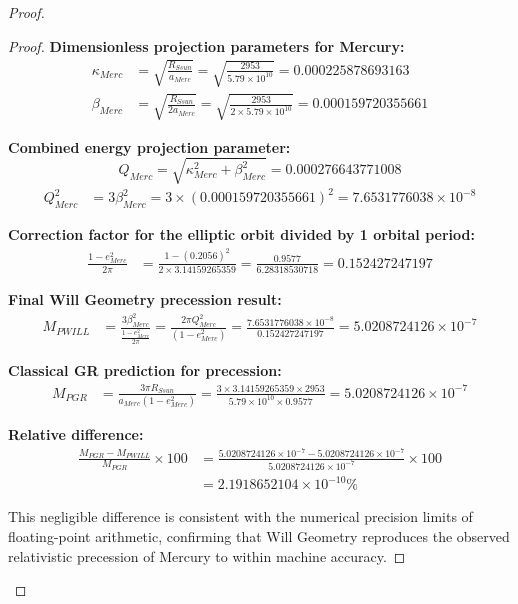 \documentclass{article}
\begin{document}
\begin{proof}
\begin{proof}
\textbf{Dimensionless projection parameters for Mercury:}
\begin{align}
\kappa_{Merc} &= \sqrt{\frac{R_{Ssun}}{a_{Merc}}} = \sqrt{\frac{2953}{5.79 \times 10^{10}}} = 0.000225878693163 \\
\beta_{Merc} &= \sqrt{\frac{R_{Ssun}}{2 a_{Merc}}} = \sqrt{\frac{2953}{2 \times 5.79 \times 10^{10}}} = 0.000159720355661
\end{align}

\textbf{Combined energy projection parameter:}
\[
Q_{Merc}=\sqrt{\kappa_{Merc}^{2}+\beta_{Merc}^{2}}=0.000276643771008
\]
\begin{align}
Q_{Merc}^{2} &= 3 \beta_{Merc}^{2} = 3 \times (0.000159720355661)^2 = 7.6531776038 \times 10^{-8}
\end{align}

\textbf{Correction factor for the elliptic orbit divided by 1 orbital period:}
\begin{align}
\frac{1 - e_{Merc}^{2}}{2\pi} &= \frac{1 - (0.2056)^2}{2 \times 3.14159265359} = \frac{0.9577}{6.28318530718} = 0.152427247197
\end{align}

\textbf{Final Will Geometry precession result:}
\begin{align}
M_{PWILL} &= \frac{3 \beta_{Merc}^{2}}{\frac{1 - e_{Merc}^{2}}{2\pi}} = \frac{2\pi Q_{Merc}^{2}}{\left(1-e_{Merc}^{2}\right)}=\frac{7.6531776038 \times 10^{-8}}{0.152427247197} = 5.0208724126 \times 10^{-7}
\end{align}

\textbf{Classical GR prediction for precession:}
\begin{align}
M_{PGR} &= \frac{3\pi R_{Ssun}}{a_{Merc} (1 - e_{Merc}^{2})} = \frac{3 \times 3.14159265359 \times 2953}{5.79 \times 10^{10} \times 0.9577} = 5.0208724126 \times 10^{-7}
\end{align}

\textbf{Relative difference:}
\begin{align}
\frac{M_{PGR} - M_{PWILL}}{M_{PGR}} \times 100 &= \frac{5.0208724126 \times 10^{-7} - 5.0208724126 \times 10^{-7}}{5.0208724126 \times 10^{-7}} \times 100 \\
&= 2.1918652104 \times 10^{-10} \%
\end{align}

This negligible difference is consistent with the numerical precision limits of floating-point arithmetic, confirming that Will Geometry reproduces the observed relativistic precession of Mercury to within machine accuracy.


\end{proof}
\end{proof}
\end{document}
